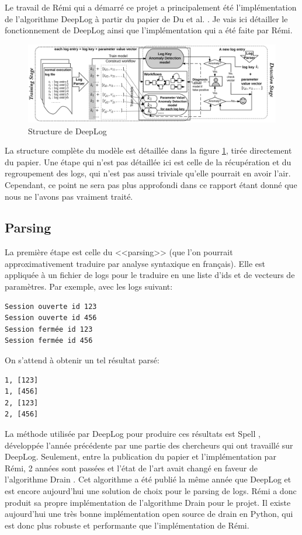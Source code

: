 \documentclass[openany, 11pt]{memoir}
\begin{document}
Le travail de Rémi qui a démarré ce projet a principalement été l'implémentation de l'algorithme DeepLog à partir du papier de Du et al. \cite{deeplog}. Je vais ici détailler le fonctionnement de DeepLog ainsi que l'implémentation qui a été faite par Rémi.

\begin{figure}[ht]
	\centering
	\includegraphics[width=\textwidth]{images/deeplog.png}
	\caption{Structure de DeepLog}
	\label{deeplog}
\end{figure}

La structure complète du modèle est détaillée dans la figure \ref{deeplog}, tirée directement du papier. Une étape qui n'est pas détaillée ici est celle de la récupération et du regroupement des \glspl{log}, qui n'est pas aussi triviale qu'elle pourrait en avoir l'air. Cependant, ce point ne sera pas plus approfondi dans ce rapport étant donné que nous ne l'avons pas vraiment traité.

\subsection{Parsing}

La première étape est celle du <<parsing>> (que l'on pourrait approximativement traduire par analyse syntaxique en français). Elle est appliquée à un fichier de \glspl{log} pour le traduire en une liste d'ids et de vecteurs de paramètres. Par exemple, avec les logs suivant:

\begin{lstlisting}
Session ouverte id 123
Session ouverte id 456
Session fermée id 123
Session fermée id 456
\end{lstlisting}

On s'attend à obtenir un tel résultat parsé:

\begin{lstlisting}
1, [123]
1, [456]
2, [123]
2, [456]
\end{lstlisting}

La méthode utilisée par DeepLog pour produire ces résultats est Spell \cite{spell}, développée l'année précédente par une partie des chercheurs qui ont travaillé sur DeepLog. Seulement, entre la publication du papier et l'implémentation par Rémi, 2 années sont passées et l'état de l'art avait changé en faveur de l'algorithme Drain \cite{drain}. Cet algorithme a été publié la même année que DeepLog et est encore aujourd'hui une solution de choix pour le parsing de \glspl{log}. Rémi a donc produit sa propre implémentation de l'algorithme Drain pour le projet. Il existe aujourd'hui une très bonne implémentation open source de drain en Python, qui est donc plus robuste et performante que l'implémentation de Rémi.
\end{document}
